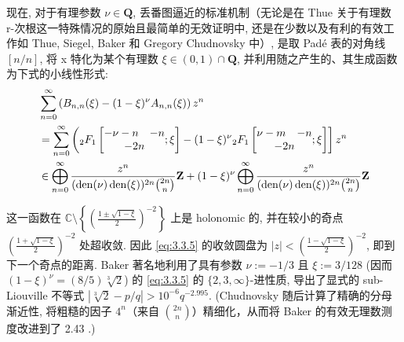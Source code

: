 现在, 对于有理参数 \(\nu \in \mathbf{Q}\), 丢番图逼近的标准机制（无论是在 Thue 关于有理数 r-次根这一特殊情况的原始且最简单的无效证明中, 还是在少数以及有利的有效工作如 Thue, Siegel, Baker 和 Gregory Chudnovsky \cite{Chu83b} 中）, 
是取 Pad{\'e} 表的对角线 \([n/n]\), 将 x 特化为某个有理数 \(\xi \in (0,1) \cap \mathbf{Q}\), 
并利用随之产生的、其生成函数为下式的小线性形式:
\begin{equation}\label{eq:3.3.5}
    \begin{aligned}
    & \sum_{n=0}^{\infty} \left( B_{n,n}(\xi) - (1-\xi)^{\nu} A_{n,n}(\xi) \right) z^n  \\
    &= \sum_{n=0}^{\infty} \left( {}_{2}F_{1} \left[ \begin{matrix} -\nu-n & -n \\ \multicolumn{2}{c}{-2n} \end{matrix} ; \xi \right] - (1-\xi)^{\nu} {}_{2}F_{1} \left[ \begin{matrix} \nu-m & -n \\ \multicolumn{2}{c}{-2n} \end{matrix} ; \xi \right] \right] z^n  \\
    &\in \bigoplus_{n=0}^{\infty} \frac{z^n}{(\operatorname{den}(\nu)\operatorname{den}(\xi))^{2n}\binom{2n}{n}} \mathbf{Z} + (1-\xi)^{\nu} \bigoplus_{n=0}^{\infty} \frac{z^n}{(\operatorname{den}(\nu)\operatorname{den}(\xi))^{2n}\binom{2n}{n}} \mathbf{Z} 
    \end{aligned}
\end{equation}


这一函数在 \(\mathbb{C} \setminus \left\{ \left( \frac{1 \pm \sqrt{1 - \xi}}{2} \right)^{-2} \right\}\) 上是 holonomic 的, 
并在较小的奇点 \(\left( \frac{1 + \sqrt{1 - \xi}}{2} \right)^{-2}\) 处超收敛. 
因此 \eqref{eq:3.3.5} 的收敛圆盘为 \(|z| < \left( \frac{1 - \sqrt{1 - \xi}}{2} \right)^{-2}\), 
即到下一个奇点的距离. 
Baker \cite{Bak64} 著名地利用了具有参数 \(\nu := -1/3\) 且 \(\xi := 3/128\) (因而 \((1 - \xi)^{\nu} = (8/5)\sqrt[3]{2}\)) 的 \eqref{eq:3.3.5} 的 \(\{2, 3, \infty\}\)-进性质, 
导出了显式的 sub-Liouville 不等式 \(|\sqrt[3]{2} - p/q| > 10^{-6}q^{-2.995}\). 
(Chudnovsky 随后计算了精确的分母渐近性, 将粗糙的因子 \(4^n\)（来自 \(\binom{2n}{n}\)）精细化，从而将 Baker 的有效无理数测度改进到了 2.43 \cite{Chu83b}.)

